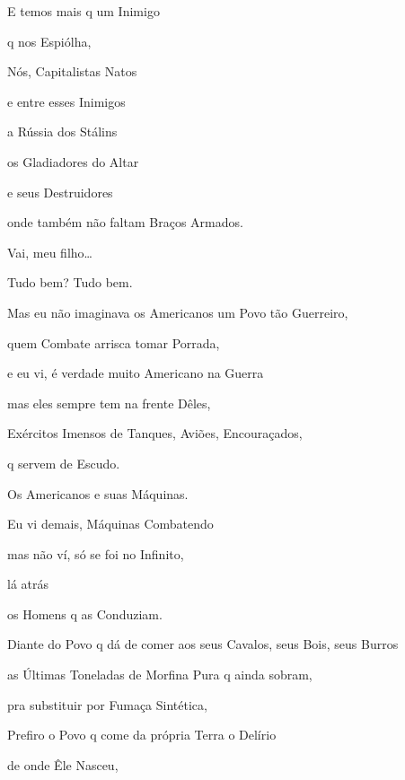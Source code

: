 

E temos mais q um Inimigo

q nos Espiólha,

Nós, Capitalistas Natos

e entre esses Inimigos

a Rússia dos Stálins

os Gladiadores do Altar

e seus Destruidores

onde também não faltam Braços Armados.


Vai, meu filho\ldots{}


Tudo bem? Tudo bem.

Mas eu não imaginava os Americanos um Povo tão Guerreiro,

quem Combate arrisca tomar Porrada,

e eu vi, é verdade muito Americano na Guerra

mas eles sempre tem na frente Dêles,

Exércitos Imensos de Tanques, Aviões, Encouraçados,

q servem de Escudo.

Os Americanos e suas Máquinas. 

Eu vi demais, Máquinas Combatendo

mas não ví, só se foi no Infinito, 

lá atrás

os Homens q as Conduziam.


Diante do Povo q dá de comer aos seus Cavalos, seus Bois, seus Burros

as Últimas Toneladas de Morfina Pura q ainda sobram, 

pra substituir por Fumaça Sintética, 

Prefiro o Povo q come da própria Terra o Delírio

de onde Êle Nasceu,

